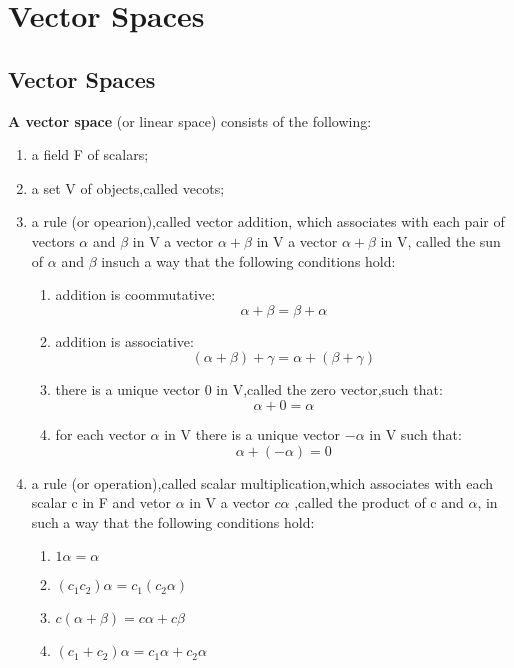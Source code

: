\chapter{Vector Spaces}

\section{Vector Spaces}

\begin{definition}
	\textbf{A vector space} (or linear space) consists of the following:
	\begin{enumerate}
		\item a field F of scalars;
		\item a set V of objects,called vecots;
		\item a rule (or opearion),called vector addition, which associates with each pair of vectors $\alpha$ and $\beta$ in V a vector $\alpha + \beta$ in V a vector $\alpha + \beta$ in V, called the sun of $\alpha$ and $\beta$ insuch a way that the following conditions hold:
		      \begin{enumerate}
			      \item addition is coommutative: \[
				            \alpha + \beta = \beta + \alpha
			            \]
			      \item addition is associative: \[
				            (\alpha + \beta) + \gamma = \alpha + (\beta + \gamma)
			            \]
			      \item there is a unique vector 0 in V,called the zero vector,such that: \[
				            \alpha + 0 = \alpha
			            \]
			      \item for each vector $\alpha$ in V there is a unique vector $-\alpha$ in V such that: \[
				            \alpha + (-\alpha) = 0
			            \]
		      \end{enumerate}
		\item a rule (or operation),called scalar multiplication,which associates with each scalar c in F and vetor $\alpha$ in V a vector $c\alpha$ ,called the product of c and $\alpha$, in such a way that the following conditions hold:
		      \begin{enumerate}
			      \item $1\alpha = \alpha$
			      \item $(c_1c_2)\alpha = c_1(c_2\alpha)$
			      \item $c(\alpha + \beta) = c\alpha + c\beta$
			      \item $(c_1 + c_2)\alpha = c_1\alpha + c_2\alpha$
		      \end{enumerate}
	\end{enumerate}
\end{definition}

